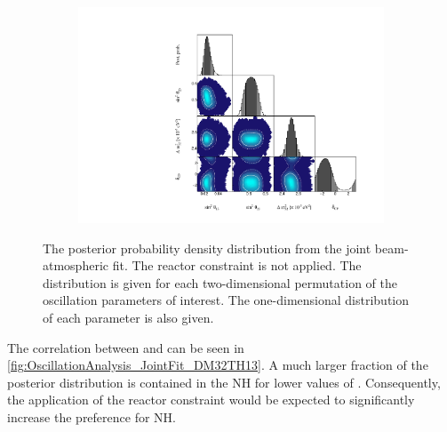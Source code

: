 \begin{figure}[h]
  \begin{subfigure}[t]{0.98\textwidth}
    \includegraphics[width=\textwidth, trim={0mm 0mm 0mm 0mm}, clip,page=1]{Figures/OA/JointFit/Contours_1D_woRC_UnSmeared_CredibleInterval_TrianglePlot.pdf}
  \end{subfigure}
  \caption{The posterior probability density distribution from the joint beam-atmospheric fit. The reactor constraint is not applied. The distribution is given for each two-dimensional permutation of the oscillation parameters of interest. The one-dimensional distribution of each parameter is also given.}
  \label{fig:OscillationAnalysis_JointFit_TriPlot}
\end{figure}

The correlation between  and  can be seen in \autoref{fig:OscillationAnalysis_JointFit_DM32TH13}. A much larger fraction of the posterior distribution is contained in the NH for lower values of . Consequently, the application of the reactor constraint would be expected to significantly increase the preference for NH.

